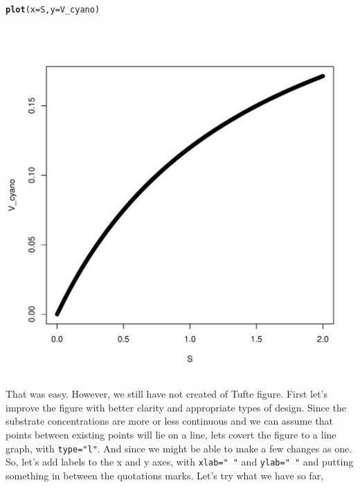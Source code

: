 \documentclass{tufte-handout}\usepackage[]{graphicx}\usepackage[]{color}
\makeatletter
\def\maxwidth{ %
  \ifdim\Gin@nat@width>\linewidth
    \linewidth
  \else
    \Gin@nat@width
  \fi
}
\newcommand{\hlstd}[1]{\textcolor[rgb]{0.345,0.345,0.345}{#1}}%
\newcommand{\hlkwc}[1]{\textcolor[rgb]{0.333,0.667,0.333}{#1}}%
\newcommand{\hlkwd}[1]{\textcolor[rgb]{0.737,0.353,0.396}{\textbf{#1}}}%
\newenvironment{kframe}{%
 \def\at@end@of@kframe{}%
 \ifinner\ifhmode%
  \def\at@end@of@kframe{\end{minipage}}%
  \begin{minipage}{\columnwidth}%
 \fi\fi%
 \def\FrameCommand##1{\hskip\@totalleftmargin \hskip-\fboxsep
 \colorbox{shadecolor}{##1}\hskip-\fboxsep
     \hskip-\linewidth \hskip-\@totalleftmargin \hskip\columnwidth}%
 \MakeFramed {\advance\hsize-\width
   \@totalleftmargin\z@ \linewidth\hsize
   \@setminipage}}%
 {\par\unskip\endMakeFramed%
 \at@end@of@kframe}
\newenvironment{knitrout}{}{} %
\makeatother
\begin{document}
\begin{knitrout}
\color{fgcolor}\begin{kframe}
\begin{alltt}
\hlkwd{plot}\hlstd{(}\hlkwc{x}\hlstd{=S,} \hlkwc{y}\hlstd{=V_cyano)}
\end{alltt}
\end{kframe}
\includegraphics[width=\maxwidth]{figure/unnamed-chunk-59-1} 
\end{knitrout}

That was easy. However, we still have not created of Tufte figure. First let's improve the figure with better clarity and appropriate types of design. Since the substrate concentrations are more or less continuous and we can assume that points between existing points will lie on a line, lets covert the figure to a line graph, with \texttt{type="l"}. And since we might be able to make a few changes as one.  So, let's add labels to the x and y axes, with \texttt{xlab=" "} and \texttt{ylab=" "} and putting something in between the quotations marks.  Let's try what we have so far,
\end{document}
